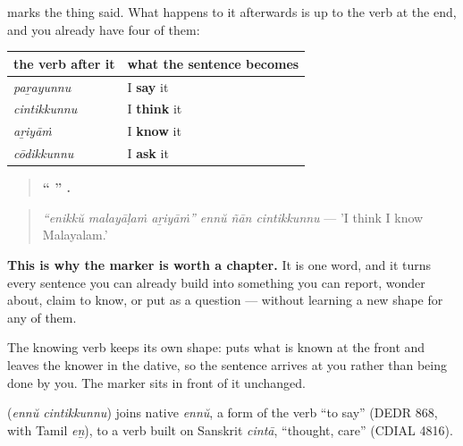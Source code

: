 \begin{grammarlens}[title={Grammar Lens: one marker, four verbs}]
\textbf{} marks the thing said. What happens to it afterwards is up to the verb at the end, and you already have four of them:

\noindent
\begin{tabularx}{\linewidth}{@{}>{\raggedright\arraybackslash}X>{\raggedright\arraybackslash}X@{}}
\toprule
\textbf{the verb after it} & \textbf{what the sentence becomes} \\
\midrule
\textbf{\ml{പറയുന്നു}} \emph{paṟayunnu} & I \textbf{say} it \\
\textbf{\ml{ചിന്തിക്കുന്നു}} \emph{cintikkunnu} & I \textbf{think} it \\
\textbf{\ml{അറിയാം}} \emph{aṟiyāṁ} & I \textbf{know} it \\
\textbf{\ml{ചോദിക്കുന്നു}} \emph{cōdikkunnu} & I \textbf{ask} it \\
\bottomrule
\end{tabularx}

\begin{quote}
\textbf{\textquotedblleft{}  \textquotedblright{}   .}
\end{quote}

\begin{quote}
\emph{\textquotedblleft{}enikkŭ malayāḷaṁ aṟiyāṁ\textquotedblright{} ennŭ ñān cintikkunnu} — 'I think I know Malayalam.'
\end{quote}

\textbf{This is why the marker is worth a chapter.} It is one word, and it turns every sentence you can already build into something you can report, wonder about, claim to know, or put as a question — without learning a new shape for any of them.

The knowing verb keeps its own shape: \textbf{} puts what is known at the front and leaves the knower in the dative, so the sentence arrives at you rather than being done by you. The marker sits in front of it unchanged.
\end{grammarlens}

\begin{cousinweb}
\textbf{ } (\emph{ennŭ cintikkunnu}) joins native \emph{ennŭ}, a form of the verb \textquotedblleft{}to say\textquotedblright{} (DEDR 868, with Tamil \emph{eṉ}), to a verb built on Sanskrit \emph{cintā}, \textquotedblleft{}thought, care\textquotedblright{} (CDIAL 4816).
\end{cousinweb}

